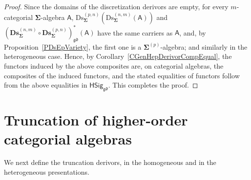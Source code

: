 \documentclass[a4paper, reqno]{amsbook}
\newcommand{\sig}[1]{\mathbf{#1}}             %
\newcommand{\calg}[1]{\boldsymbol{\mathsf{#1}}} %
\newcommand{\gd}{\mathfrak{gd}}              %
\newcommand{\Ds}{\mathrm{Ds}}
\newcommand{\bDs}{\mathbf{Ds}}
\theoremstyle{plain}
\theoremstyle{definition}
\begin{document}
\begin{proof}
Since the domains of the discretization derivors are empty, for every $m$-categorial $\sig{\Sigma}$-algebra $\calg{A}$, $\Ds^{(p,n)}_{\sig{\Sigma}}(\Ds^{(n,m)}_{\sig{\Sigma}}(\calg{A}))$ and $(\bDs^{(n,m)}_{\sig{\Sigma}}\circ\bDs^{(p,n)}_{\sig{\Sigma}})^{\ast}_{\gd}(\calg{A})$ have the same carriers as $\calg{A}$, and, by Proposition~\ref{PDsEpVariety}, the first one is a $\sig{\Sigma}^{(p)}$-algebra; and similarly in the heterogeneous case.
Hence, by Corollary~\ref{CGenHepDerivorCompEqual}, the functors induced by the above composites are, on categorial algebras, the composites of the induced functors, and the stated equalities of functors follow from the above equalities in $\mathsf{HSig}_{\gd}$. This completes the proof.
\end{proof}

\section{Truncation of higher-order categorial algebras}\label{STr}

We next define the truncation derivors, in the homogeneous and in the heterogeneous presentations.
\end{document}
